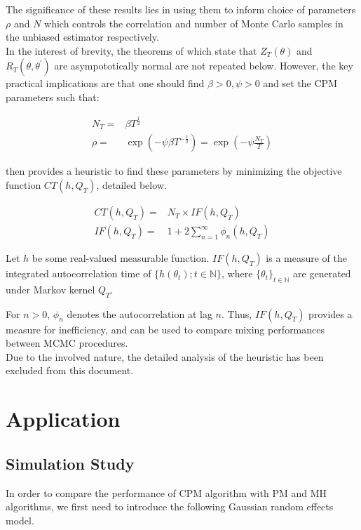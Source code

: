 \documentclass{article}
\begin{document}
The significance of these results lies in using them to inform choice of parameters $\rho$ and $N$ which controls the correlation and number of Monte Carlo samples in the unbiased estimator respectively. \\

In the interest of brevity, the theorems of \cite{cpmmDeligiannidis2015} which state that $Z_T(\theta)$ and $R_T(\theta, \theta^\prime)$ are asympototically normal are not repeated below. However, the key practical implications are that one should find $\beta>0, \psi>0$ and set the CPM parameters such that:

\begin{align}
N_T =& \beta T ^{\frac{1}{2}} \\
\rho =& \exp(-\psi \beta T ^ {-\frac{1}{2}}) = \exp(-\psi \frac{N_T}{T})
\end{align}

\cite{cpmmDeligiannidis2015} then provides a heuristic to find these parameters by minimizing the objective function $CT(h, Q_T)$, detailed below.

\begin{align}
CT(h, Q_T) =& N_T \times IF(h, Q_T) \\
IF(h, Q_T) =& 1 + 2 \sum_{n=1}^{\infty} \phi_n (h, Q_T) \label{eq:IF}
\end{align}


Let $h$ be some real-valued measurable function. $IF(h, Q_T)$ is a measure of the integrated autocorrelation time of $\{h(\theta_t) ; t \in \mathbb{N}\}$, where $\{\theta_t\}_{t \in \mathbb{N}}$ are generated under Markov kernel $Q_T$.

For $n>0$, $\phi_n$ denotes the autocorrelation at lag $n$. Thus, $IF(h, Q_T)$ provides a measure for inefficiency, and can be used to compare mixing performances between MCMC procedures. \\

Due to the involved nature, the detailed analysis of the heuristic has been excluded from this document.


  \section{Application}

  \subsection{Simulation Study}
  In order to compare the performance of CPM algorithm with PM and MH algorithms, we first need to introduce the following Gaussian random effects model.
\end{document}
